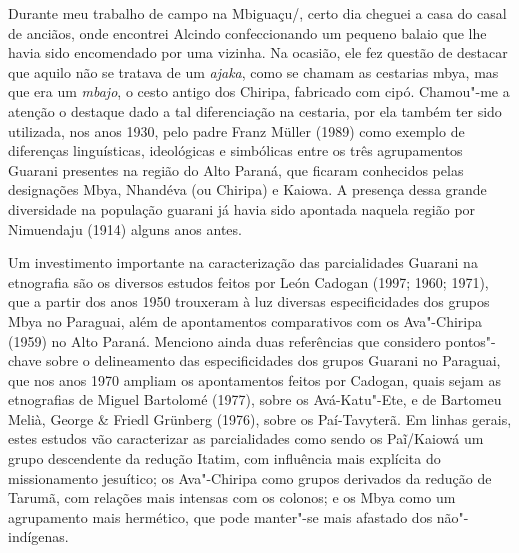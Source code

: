  


Durante meu trabalho de campo na  Mbiguaçu/, certo dia cheguei a
casa do casal de anciãos, onde encontrei Alcindo confeccionando um
pequeno balaio que lhe havia sido encomendado por uma vizinha. Na
ocasião, ele fez questão de destacar que aquilo não se tratava de um
\emph{ajaka}, como se chamam as cestarias mbya, mas que era um \emph{mbajo}, o cesto
antigo dos Chiripa, fabricado com cipó. Chamou"-me a atenção o destaque
dado a tal diferenciação na cestaria, por ela também ter sido
utilizada, nos anos 1930, pelo padre Franz Müller (1989) como exemplo
de diferenças linguísticas, ideológicas e simbólicas entre os três
agrupamentos Guarani presentes na região do Alto Paraná, que ficaram
conhecidos pelas designações Mbya, Nhandéva (ou Chiripa) e Kaiowa. A
presença dessa grande diversidade na população guarani já havia sido
apontada naquela região por Nimuendaju (1914) alguns anos antes.

Um investimento importante na caracterização das parcialidades Guarani
na etnografia são os diversos estudos feitos por León Cadogan (1997;
1960; 1971), que a partir dos anos 1950 trouxeram à luz diversas
especificidades dos grupos Mbya no Paraguai, além de apontamentos
comparativos com os Ava"-Chiripa (1959) no Alto Paraná. Menciono ainda
duas referências que considero pontos"-chave sobre o delineamento das
especificidades dos grupos Guarani no Paraguai, que nos anos 1970
ampliam os apontamentos feitos por Cadogan, quais sejam as etnografias
de Miguel Bartolomé (1977), sobre os Avá-Katu"-Ete, e de Bartomeu Melià,
George \& Friedl Grünberg (1976), sobre os Paí-Tavyterã. Em linhas
gerais, estes estudos vão caracterizar as parcialidades como sendo os
Paĩ/Kaiowá um grupo descendente da redução
Itatim, com influência mais explícita do missionamento jesuítico; os
Ava"-Chiripa como grupos derivados da redução de Tarumã, com relações
mais intensas com os colonos; e os Mbya como um agrupamento mais
hermético, que pode manter"-se mais afastado dos não"-indígenas. 

